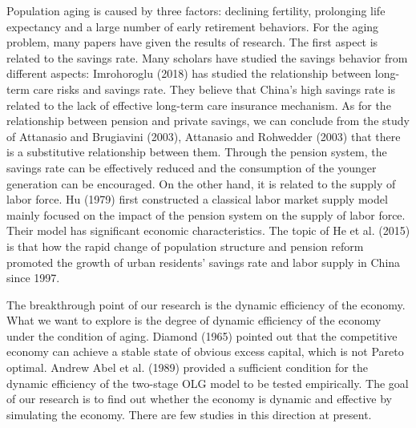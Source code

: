 \documentclass{article}
\begin{document}
    Population aging is caused by three factors: declining fertility, prolonging life expectancy and a large number of early retirement behaviors. For the aging problem, many papers have given the results of research. The first aspect is related to the savings rate. Many scholars have studied the savings behavior from different aspects: Imrohoroglu (2018) has studied the relationship between long-term care risks and savings rate. They believe that China's high savings rate is related to the lack of effective long-term care insurance mechanism. As for the relationship between pension and private savings, we can conclude from the study of Attanasio and Brugiavini (2003), Attanasio and Rohwedder (2003) that there is a substitutive relationship between them. Through the pension system, the savings rate can be effectively reduced and the consumption of the younger generation can be encouraged. On the other hand, it is related to the supply of labor force. Hu (1979) first constructed a classical labor market supply model mainly focused on the impact of the pension system on the supply of labor force. Their model has significant economic characteristics. The topic of He et al. (2015) is that how the rapid change of population structure and pension reform promoted the growth of urban residents' savings rate and labor supply in China since 1997.


    The breakthrough point of our research is the dynamic efficiency of the economy. What we want to explore is the degree of dynamic efficiency of the economy under the condition of aging. Diamond (1965) pointed out that the competitive economy can achieve a stable state of obvious excess capital, which is not Pareto optimal. Andrew Abel et al. (1989) provided a sufficient condition for the dynamic efficiency of the two-stage OLG model to be tested empirically. The goal of our research is to find out whether the economy is dynamic and effective by simulating the economy. There are few studies in this direction at present.
\end{document}
